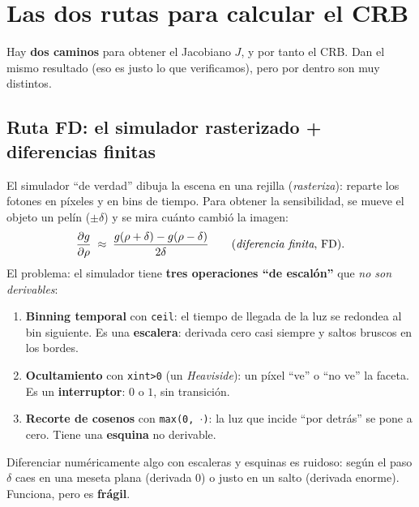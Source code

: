 \documentclass[11pt,a4paper]{article}
\begin{document}
\section{Las dos rutas para calcular el CRB}

Hay \textbf{dos caminos} para obtener el Jacobiano $J$, y por tanto el CRB. Dan el
mismo resultado (eso es justo lo que verificamos), pero por dentro son muy
distintos.

\subsection{Ruta FD: el simulador rasterizado + diferencias finitas}
El simulador ``de verdad'' dibuja la escena en una rejilla (\emph{rasteriza}):
reparte los fotones en p\'ixeles y en bins de tiempo. Para obtener la
sensibilidad, se mueve el objeto un pel\'in ($\pm\delta$) y se mira cu\'anto
cambi\'o la imagen:
\[
   \frac{\partial g}{\partial \rho}\;\approx\;\frac{g(\rho+\delta)-g(\rho-\delta)}{2\delta}
   \qquad(\text{\emph{diferencia finita}, FD}).
\]
El problema: el simulador tiene \textbf{tres operaciones ``de escal\'on''} que
\emph{no son derivables}:
\begin{enumerate}[nosep]
  \item \textbf{Binning temporal} con \texttt{ceil}: el tiempo de llegada de la luz
  se redondea al bin siguiente. Es una \textbf{escalera}: derivada cero casi
  siempre y saltos bruscos en los bordes.
  \item \textbf{Ocultamiento} con \texttt{xint>0} (un \emph{Heaviside}): un p\'ixel
  ``ve'' o ``no ve'' la faceta. Es un \textbf{interruptor}: $0$ o $1$, sin
  transici\'on.
  \item \textbf{Recorte de cosenos} con \texttt{max(0,\,$\cdot$)}: la luz que
  incide ``por detr\'as'' se pone a cero. Tiene una \textbf{esquina} no derivable.
\end{enumerate}
Diferenciar num\'ericamente algo con escaleras y esquinas es ruidoso: seg\'un el
paso $\delta$ caes en una meseta plana (derivada $0$) o justo en un salto
(derivada enorme). Funciona, pero es \textbf{fr\'agil}.
\end{document}
